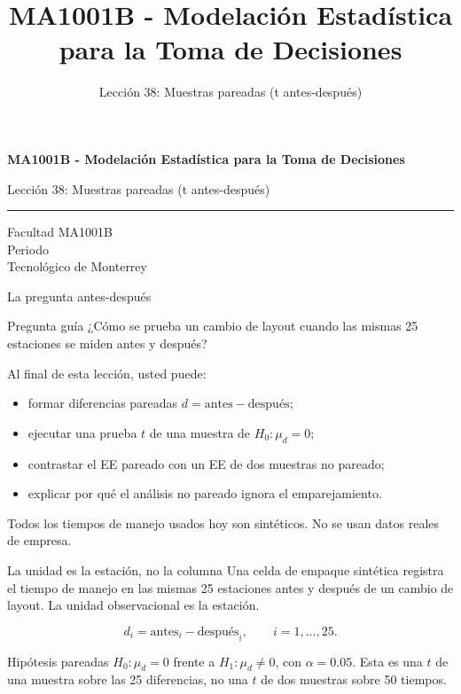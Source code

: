\documentclass[aspectratio=169,10pt,spanish]{beamer}
\title{MA1001B - Modelación Estadística para la Toma de Decisiones}
\subtitle{Lección 38: Muestras pareadas (t antes-después)}
\author{}
\institute{Tecnol\'ogico de Monterrey}
\date{}
\begin{document}
\begin{frame}[plain]
  \vspace{1.2cm}
  {\Large\bfseries MA1001B - Modelación Estadística para la Toma de Decisiones\par}
  \vspace{0.7cm}
  {\large Lección 38: Muestras pareadas (t antes-después)\par}
  \vspace{0.7cm}
  {\color{TecRojo}\rule{\textwidth}{1.2pt}}
  \vspace{0.8cm}

  Facultad MA1001B\\[0.3cm]
  Periodo\\[0.3cm]
  Tecnol\'ogico de Monterrey
\end{frame}

\begin{frame}{La pregunta antes-después}
  \begin{alertblock}{Pregunta guía}
    ¿Cómo se prueba un cambio de layout cuando las mismas 25 estaciones se
    miden antes y después?
  \end{alertblock}

  \vspace{0.6em}
  Al final de esta lección, usted puede:
  \begin{itemize}
    \item formar diferencias pareadas $d=\text{antes}-\text{después}$;
    \item ejecutar una prueba $t$ de una muestra de $H_0:\mu_d=0$;
    \item contrastar el EE pareado con un EE de dos muestras no pareado;
    \item explicar por qué el análisis no pareado ignora el emparejamiento.
  \end{itemize}

  \vfill
  \scriptsize Todos los tiempos de manejo usados hoy son sintéticos. No se usan datos reales de empresa.
\end{frame}

\begin{frame}{La unidad es la estación, no la columna}
  \small
  Una celda de empaque sintética registra el tiempo de manejo en las mismas
  25 estaciones antes y después de un cambio de layout. La unidad
  observacional es la estación.

  \[
    d_i = \text{antes}_i - \text{después}_i,\qquad i=1,\ldots,25.
  \]

  \begin{exampleblock}{Hipótesis pareadas}
    $H_0:\mu_d=0$ frente a $H_1:\mu_d\neq 0$, con $\alpha=0.05$. Esta es una
    $t$ de una muestra sobre las 25 diferencias, no una $t$ de dos muestras
    sobre 50 tiempos.
  \end{exampleblock}
\end{frame}
\end{document}
